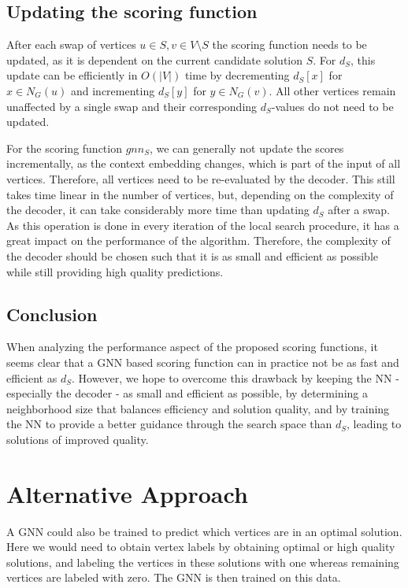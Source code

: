 \documentclass[draft,final]{vutinfth} %
\begin{document}
\subsection{Updating the scoring function}
After each swap of vertices $u \in S, v \in V \setminus S$ the scoring function needs to be updated, as it is dependent on the current candidate solution $S$. For $d_S$, this update can be efficiently in $O(|V|)$ time by decrementing $d_S[x]$ for $x \in N_G(u)$ and incrementing $d_S[y]$ for $y \in N_G(v)$. All other vertices remain unaffected by a single swap and their corresponding $d_S$-values do not need to be updated. 

For the scoring function $gnn_S$, we can generally not update the scores incrementally, as the context embedding changes, which is part of the input of all vertices. Therefore, all vertices need to be re-evaluated by the decoder. This still takes time linear in the number of vertices, but, depending on the complexity of the decoder, it can take considerably more time than updating $d_S$ after a swap. As this operation is done in every iteration of the local search procedure, it has a great impact on the performance of the algorithm. Therefore, the complexity of the decoder should be chosen such that it is as small and efficient as possible while still providing high quality predictions. 

\subsection{Conclusion}
When analyzing the performance aspect of the proposed scoring functions, it seems clear that a GNN based scoring function can in practice not be as fast and efficient as $d_S$. However, we hope to overcome this drawback by keeping the NN - especially the decoder - as small and efficient as possible, by determining a neighborhood size that balances efficiency and solution quality, and by training the NN to provide a better guidance through the search space than $d_S$, leading to solutions of improved quality. 

\section{Alternative Approach}

A GNN could also be trained to predict which vertices are in an optimal solution. 
Here we would need to obtain vertex labels by obtaining optimal or high quality solutions, and labeling the vertices in these solutions with one whereas remaining vertices are labeled with zero. The GNN is then trained on this data. 
\end{document}
